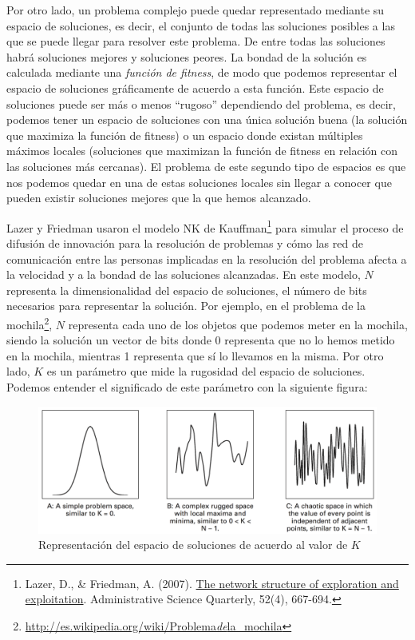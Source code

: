 \documentclass[]{article}
\begin{document}
Por otro lado, un problema complejo puede quedar representado mediante
su espacio de soluciones, es decir, el conjunto de todas las soluciones
posibles a las que se puede llegar para resolver este problema. De entre
todas las soluciones habrá soluciones mejores y soluciones peores. La
bondad de la solución es calculada mediante una \emph{función de
fitness}, de modo que podemos representar el espacio de soluciones
gráficamente de acuerdo a esta función. Este espacio de soluciones puede
ser más o menos ``rugoso'' dependiendo del problema, es decir, podemos
tener un espacio de soluciones con una única solución buena (la solución
que maximiza la función de fitness) o un espacio donde existan múltiples
máximos locales (soluciones que maximizan la función de fitness en
relación con las soluciones más cercanas). El problema de este segundo
tipo de espacios es que nos podemos quedar en una de estas soluciones
locales sin llegar a conocer que pueden existir soluciones mejores que
la que hemos alcanzado.

Lazer y Friedman usaron el modelo NK de Kauffman\footnote{Lazer, D., \&
  Friedman, A. (2007).
  \href{http://www.ksg.harvard.edu/davidlazer/files/papers/Lazer_Friedman_ASQ.pdf}{The
  network structure of exploration and exploitation}. Administrative
  Science Quarterly, 52(4), 667-694.} para simular el proceso de
difusión de innovación para la resolución de problemas y cómo las red de
comunicación entre las personas implicadas en la resolución del problema
afecta a la velocidad y a la bondad de las soluciones alcanzadas. En
este modelo, \(N\) representa la dimensionalidad del espacio de
soluciones, el número de bits necesarios para representar la solución.
Por ejemplo, en el problema de la mochila\footnote{\href{http://es.wikipedia.org/wiki/Problema_de_la_mochila}{http://es.wikipedia.org/wiki/Problema\emph{de}la\_mochila}},
\(N\) representa cada uno de los objetos que podemos meter en la
mochila, siendo la solución un vector de bits donde 0 representa que no
lo hemos metido en la mochila, mientras 1 representa que sí lo llevamos
en la misma. Por otro lado, \(K\) es un parámetro que mide la rugosidad
del espacio de soluciones. Podemos entender el significado de este
parámetro con la siguiente figura:

\begin{figure}[htbp]
\centering
\includegraphics{../images/tema08/NK.png}
\caption{Representación del espacio de soluciones de acuerdo al valor de
\(K\)}
\end{figure}
\end{document}

